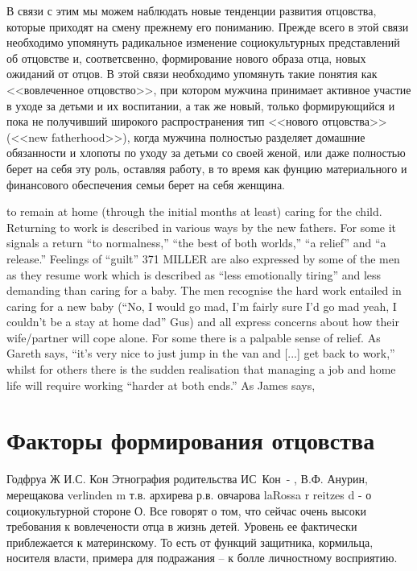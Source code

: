 \documentclass{../../common/thesisbyxetex}
\begin{document}
В связи с этим мы можем наблюдать новые тенденции развития отцовства, которые приходят на смену
прежнему его пониманию. Прежде всего в этой связи необходимо упомянуть радикальное изменение
социокультурных представлений об отцовстве и, соответсвенно, формирование нового образа отца, новых
ожиданий от отцов. В этой связи необходимо упомянуть такие понятия как <<вовлеченное отцовство>>,
при котором мужчина принимает активное участие в уходе за детьми и их воспитании, а так же
новый,  только формирующийся и пока не получивший широкого распространения  тип <<нового
отцовства>> (<<new fatherhood>>), когда мужчина полностью разделяет домашние обязанности и хлопоты
по уходу за детьми со своей женой, или даже полностью берет на себя эту роль, оставляя работу, в то
время как фунцию материального и финансового обеспечения семьи берет на себя женщина.

to remain at home (through the initial months at least) caring for the child. Returning
to work is described in various ways by the new fathers. For some it signals a return
“to normalness,” “the best of both worlds,” “a relief” and “a release.” Feelings of “guilt”
371
MILLER
are also expressed by some of the men as they resume work which is described as “less
emotionally tiring” and less demanding than caring for a baby. The men recognise the
hard work entailed in caring for a new baby (“No, I would go mad, I’m fairly sure I’d
go mad yeah, I couldn’t be a stay at home dad” Gus) and all express concerns about how
their wife/partner will cope alone. For some there is a palpable sense of relief. As
Gareth says, “it’s very nice to just jump in the van and [...] get back to work,” whilst
for others there is the sudden realisation that managing a job and home life will require
working “harder at both ends.”\cite[370-371]{tri} As James says,
\section{Факторы формирования отцовства}




Годфруа Ж 
И.С. Кон Этнография родительства
ИС Кон -
,
В.Ф. Анурин, мерещакова verlinden m
т.в. архирева
р.в. овчарова
laRossa r reitzes d  - о социокультурной стороне О.
Все говорят о том, что сейчас очень высоки требования к вовлечености отца в жизнь детей. Уровень ее 
фактически приблежается к материнскому. То есть от функций защитника, кормильца, носителя власти, 
примера для подражания – к болле личностному восприятию.
\end{document}
